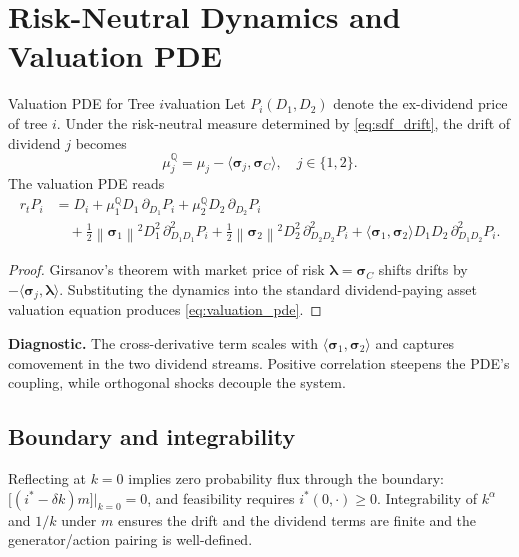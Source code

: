 ﻿\documentclass[11pt,letterpaper,oneside]{article}
\numberwithin{equation}{section}
\newcommand{\1}{\mathbf{1}}
\newcommand{\ip}[2]{\langle #1,#2\rangle}
\newcommand{\norm}[1]{\left\lVert #1\right\rVert}
\begin{document}
\section{Risk-Neutral Dynamics and Valuation PDE}\label{sec:pde}
\begin{proposition}{Valuation PDE for Tree $i$}{valuation}
Let $P_i(D_1,D_2)$ denote the ex-dividend price of tree $i$. Under the risk-neutral measure determined by \eqref{eq:sdf_drift}, the drift of dividend $j$ becomes
\begin{equation}\label{eq:rn_drift}
  \mu_j^{\mathbb{Q}} = \mu_j - \ip{\bm{\sigma}_j}{\bm{\sigma}_C}, \quad j \in \{1,2\}.
\end{equation}
The valuation PDE reads
\begin{align}\label{eq:valuation_pde}
  r_t P_i &= D_i
  + \mu_1^{\mathbb{Q}} D_1\, \partial_{D_1} P_i
  + \mu_2^{\mathbb{Q}} D_2\, \partial_{D_2} P_i \\
  &\quad + \tfrac{1}{2} \norm{\bm{\sigma}_1}^2 D_1^2\, \partial_{D_1 D_1}^2 P_i
  + \tfrac{1}{2} \norm{\bm{\sigma}_2}^2 D_2^2\, \partial_{D_2 D_2}^2 P_i
  + \ip{\bm{\sigma}_1}{\bm{\sigma}_2} D_1 D_2\, \partial_{D_1 D_2}^2 P_i.
\end{align}
\end{proposition}
\begin{proof}
Girsanov's theorem with market price of risk $\bm{\lambda}=\bm{\sigma}_C$ shifts drifts by $-\ip{\bm{\sigma}_j}{\bm{\lambda}}$. Substituting the dynamics into the standard dividend-paying asset valuation equation produces \eqref{eq:valuation_pde}.
\end{proof}

\begin{tcolorbox}[mathstyle]
\textbf{Diagnostic.} The cross-derivative term scales with $\ip{\bm{\sigma}_1}{\bm{\sigma}_2}$ and captures comovement in the two dividend streams. Positive correlation steepens the PDE's coupling, while orthogonal shocks decouple the system.
\end{tcolorbox}

\subsection{Boundary and integrability}
Reflecting at $k=0$ implies zero probability flux through the boundary:
$\big[(i^*-\delta k)m\big]\big|_{k=0}=0$,
and feasibility requires $i^*(0,\cdot)\ge 0$. Integrability of $k^\alpha$ and $1/k$ under $m$ ensures the drift and the dividend terms are finite and the generator/action pairing is well-defined.
\end{document}
